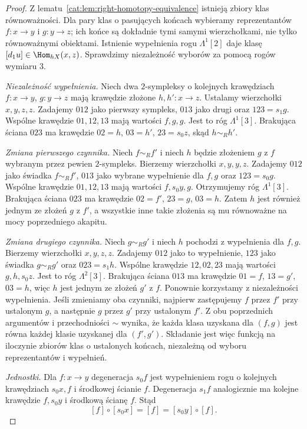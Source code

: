 \begin{proof}
Z lematu~\ref{cat:lem:right-homotopy-equivalence} istnieją zbiory klas równoważności. Dla pary klas o pasujących końcach wybieramy reprezentantów $f:x\to y$ i $g:y\to z$; ich końce są dokładnie tymi samymi wierzchołkami, nie tylko równoważnymi obiektami. Istnienie wypełnienia rogu $\Lambda^1[2]$ daje klasę $[d_1u]\in\Hom_{hX}(x,z)$. Sprawdzimy niezależność wyborów za pomocą rogów wymiaru $3$.

\emph{Niezależność wypełnienia.} Niech dwa $2$-sympleksy o kolejnych krawędziach $f:x\to y$, $g:y\to z$ mają krawędzie złożone $h,h':x\to z$. Ustalamy wierzchołki $x,y,z,z$. Zadajemy $012$ jako pierwszy sympleks, $013$ jako drugi oraz $123=s_1g$. Wspólne krawędzie $01,12,13$ mają wartości $f,g,g$. Jest to róg $\Lambda^1[3]$. Brakująca ściana $023$ ma krawędzie $02=h$, $03=h'$, $23=s_0z$, skąd $h\sim_R h'$.

\emph{Zmiana pierwszego czynnika.} Niech $f\sim_R f'$ i niech $h$ będzie złożeniem $g$ z $f$ wybranym przez pewien $2$-sympleks. Bierzemy wierzchołki $x,y,y,z$. Zadajemy $012$ jako świadka $f\sim_R f'$, $013$ jako wybrane wypełnienie dla $f,g$ oraz $123=s_0g$. Wspólne krawędzie $01,12,13$ mają wartości $f,s_0y,g$. Otrzymujemy róg $\Lambda^1[3]$. Brakująca ściana $023$ ma krawędzie $02=f'$, $23=g$, $03=h$. Zatem $h$ jest również jednym ze złożeń $g$ z $f'$, a wszystkie inne takie złożenia są mu równoważne na mocy poprzedniego akapitu.

\emph{Zmiana drugiego czynnika.} Niech $g\sim_R g'$ i niech $h$ pochodzi z wypełnienia dla $f,g$. Bierzemy wierzchołki $x,y,z,z$. Zadajemy $012$ jako to wypełnienie, $123$ jako świadka $g\sim_R g'$ oraz $023=s_1h$. Wspólne krawędzie $12,02,23$ mają wartości $g,h,s_0z$. Jest to róg $\Lambda^2[3]$. Brakująca ściana $013$ ma krawędzie $01=f$, $13=g'$, $03=h$, więc $h$ jest jednym ze złożeń $g'$ z $f$. Ponownie korzystamy z niezależności wypełnienia. Jeśli zmieniamy oba czynniki, najpierw zastępujemy $f$ przez $f'$ przy ustalonym $g$, a następnie $g$ przez $g'$ przy ustalonym $f'$. Z obu poprzednich argumentów i przechodniości $\sim$ wynika, że każda klasa uzyskana dla $(f,g)$ jest równa każdej klasie uzyskanej dla $(f',g')$. Składanie jest więc funkcją na iloczynie zbiorów klas o ustalonych końcach, niezależną od wyboru reprezentantów i wypełnień.

\emph{Jednostki.} Dla $f:x\to y$ degeneracja $s_0f$ jest wypełnieniem rogu o kolejnych krawędziach $s_0x,f$ i środkowej ścianie $f$. Degeneracja $s_1f$ analogicznie ma kolejne krawędzie $f,s_0y$ i środkową ścianę $f$. Stąd
\[
 [f]\circ[s_0x]=[f]=[s_0y]\circ[f].
\]


\end{proof}
